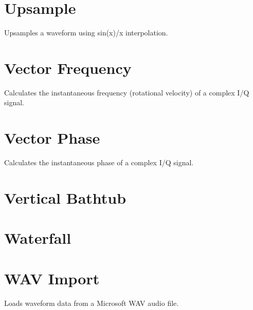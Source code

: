 \pagebreak
\section{Upsample}

Upsamples a waveform using sin(x)/x interpolation.

\pagebreak
\section{Vector Frequency}
\label{filter:vector_frequency}

Calculates the instantaneous frequency (rotational velocity) of a complex I/Q signal.

\pagebreak
\section{Vector Phase}

Calculates the instantaneous phase of a complex I/Q signal.

\pagebreak
\section{Vertical Bathtub}

\pagebreak
\section{Waterfall}

\pagebreak
\section{WAV Import}

Loads waveform data from a Microsoft WAV audio file.

\pagebreak
